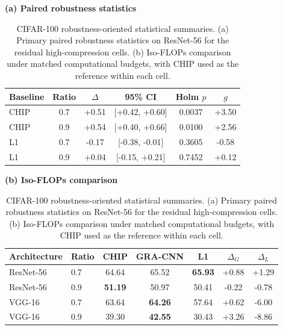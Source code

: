 \begin{table}[!htbp]
\caption{CIFAR-100 robustness-oriented statistical summaries. (a) Primary paired robustness statistics on ResNet-56 for the residual high-compression cells. (b) Iso-FLOPs comparison under matched computational budgets, with CHIP used as the reference within each cell.}
\label{tab:robustness_budget_ivc}
\centering
\begin{minipage}[t]{0.98\textwidth}
\centering
\textbf{(a) Paired robustness statistics}\par\medskip
\footnotesize
\setlength{\tabcolsep}{3pt}
\begin{tabular}{lccccc}
\toprule
Baseline & Ratio & $\Delta$ & 95\% CI & Holm $p$ & $g$ \\
\midrule
CHIP & 0.7 & +0.51 & [+0.42, +0.60] & 0.0037 & +3.50 \\
CHIP & 0.9 & +0.54 & [+0.40, +0.66] & 0.0100 & +2.56 \\
L1 & 0.7 & -0.17 & [-0.38, -0.01] & 0.3605 & -0.58 \\
L1 & 0.9 & +0.04 & [-0.15, +0.21] & 0.7452 & +0.12 \\
\bottomrule
\end{tabular}
\end{minipage}

\vspace{0.8em}

\begin{minipage}[t]{0.98\textwidth}
\centering
\textbf{(b) Iso-FLOPs comparison}\par\medskip
\footnotesize
\setlength{\tabcolsep}{3pt}
\begin{tabular}{llccccc}
\toprule
Architecture & Ratio & CHIP & GRA-CNN & L1 & $\Delta_G$ & $\Delta_L$ \\
\midrule
ResNet-56 & 0.7 & 64.64 & 65.52 & \textbf{65.93} & +0.88 & +1.29 \\
ResNet-56 & 0.9 & \textbf{51.19} & 50.97 & 50.41 & -0.22 & -0.78 \\
VGG-16 & 0.7 & 63.64 & \textbf{64.26} & 57.64 & +0.62 & -6.00 \\
VGG-16 & 0.9 & 39.30 & \textbf{42.55} & 30.43 & +3.26 & -8.86 \\
\bottomrule
\end{tabular}
\end{minipage}
\end{table}
